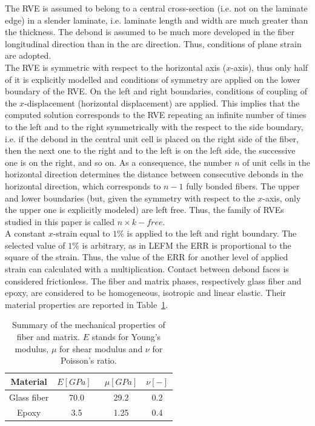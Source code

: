 The RVE is assumed to belong to a central cross-section (i.e. not on the laminate edge) in a slender laminate, i.e. laminate length and width are much greater than the thickness. The debond is assumed to be much more developed in the fiber longitudinal direction than in the arc direction. Thus, conditions of plane strain are adopted.\\
The RVE is symmetric with respect to the horizontal axis ($x$-axis), thus only half of it is explicitly modelled and conditions of symmetry are applied on the lower boundary of the RVE. On the left and right boundaries, conditions of coupling of the $x$-displacement (horizontal displacement) are applied. This implies that the computed solution corresponds to the RVE repeating an infinite number of times to the left and to the right symmetrically with the respect to the side boundary, i.e. if the debond in the central unit cell is placed on the right side of the fiber, then the next one to the right and to the left is on the left side, the successive one is on the right, and so on. As a consequence, the number $n$ of unit cells in the horizontal direction determines the distance between consecutive debonds in the horizontal direction, which corresponds to $n-1$ fully bonded fibers. The upper and lower boundaries (but, given the symmetry with respect to the $x$-axis, only the upper one is explicitly modeled) are left free. Thus, the family of RVEs studied in this paper is called $n\times k-free$.\\
A constant $x$-strain equal to $1\%$ is applied to the left and right boundary. The selected value of $1\%$ is arbitrary, as in LEFM the ERR is proportional to the square of the strain. Thus, the value of the ERR for another level of applied strain can calculated with a multiplication. Contact between debond faces is considered frictionless. The fiber and matrix phases, respectively glass fiber and epoxy, are considered to be homogeneous, isotropic and linear elastic. Their material properties are reported in Table~\ref{chap3:paperB:tab:phaseprop}.

\begin{table}[!htbp]
 \centering
 \caption{Summary of the mechanical properties of fiber and matrix. $E$ stands for Young's modulus, $\mu$ for shear modulus and $\nu$ for Poisson's ratio.}
 \begin{tabular}{cccc}
\\
\textbf{Material} & \textbf{$E\left[GPa\right]$}\ & \textbf{$\mu\left[GPa\right]$} & \textbf{$\nu\left[-\right]$} \\
\midrule
Glass fiber    & 70.0  & 29.2   & 0.2  \\
Epoxy    & 3.5    & 1.25   & 0.4
\end{tabular}
\label{chap3:paperB:tab:phaseprop}
\end{table}

